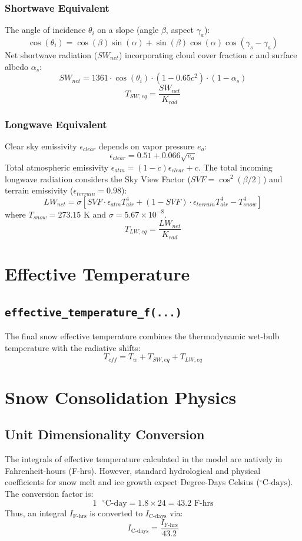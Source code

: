 \documentclass[11pt]{article}
\begin{document}
\subsubsection*{Shortwave Equivalent}
The angle of incidence $\theta_i$ on a slope (angle $\beta$, aspect $\gamma_a$):
\[
\cos(\theta_i) = \cos(\beta)\sin(\alpha) + \sin(\beta)\cos(\alpha)\cos(\gamma_s - \gamma_a)
\]
Net shortwave radiation ($SW_{net}$) incorporating cloud cover fraction $c$ and surface albedo $\alpha_s$:
\[
SW_{net} = 1361 \cdot \cos(\theta_i) \cdot (1 - 0.65 c^2) \cdot (1 - \alpha_s)
\]
\[
T_{SW,eq} = \frac{SW_{net}}{K_{rad}}
\]

\subsubsection*{Longwave Equivalent}
Clear sky emissivity $\epsilon_{clear}$ depends on vapor pressure $e_a$:
\[
\epsilon_{clear} = 0.51 + 0.066 \sqrt{e_a}
\]
Total atmospheric emissivity $\epsilon_{atm} = (1 - c)\epsilon_{clear} + c$. 
The total incoming longwave radiation considers the Sky View Factor ($SVF = \cos^2(\beta / 2)$) and terrain emissivity ($\epsilon_{terrain} = 0.98$):
\[
LW_{net} = \sigma \left[ SVF \cdot \epsilon_{atm} T_{air}^4 + (1 - SVF) \cdot \epsilon_{terrain} T_{air}^4 - T_{snow}^4 \right]
\]
where $T_{snow} = 273.15$ K and $\sigma = 5.67 \times 10^{-8}$.
\[
T_{LW,eq} = \frac{LW_{net}}{K_{rad}}
\]

\section{Effective Temperature}
\subsection{\texttt{effective\_temperature\_f(...)}}
The final snow effective temperature combines the thermodynamic wet-bulb temperature with the radiative shifts:
\[
T_{eff} = T_w + T_{SW,eq} + T_{LW,eq}
\]

\section{Snow Consolidation Physics}
\subsection{Unit Dimensionality Conversion}
The integrals of effective temperature calculated in the model are natively in Fahrenheit-hours (F-hrs). However, standard hydrological and physical coefficients for snow melt and ice growth expect Degree-Days Celsius ($^\circ\text{C-days}$). The conversion factor is:
\[
1 \text{ } ^\circ\text{C-day} = 1.8 \times 24 = 43.2 \text{ F-hrs}
\]
Thus, an integral $I_{\text{F-hrs}}$ is converted to $I_{\text{C-days}}$ via:
\[
I_{\text{C-days}} = \frac{I_{\text{F-hrs}}}{43.2}
\]
\end{document}
